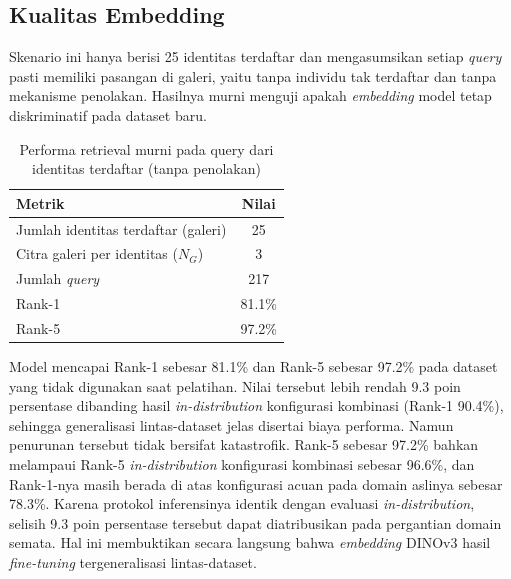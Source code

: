 \subsection{Kualitas Embedding}
\label{subsec:openset_retrieval_only}

Skenario ini hanya berisi 25 identitas terdaftar dan mengasumsikan setiap \textit{query}
pasti memiliki pasangan di galeri, yaitu tanpa individu tak terdaftar dan tanpa mekanisme
penolakan. Hasilnya murni menguji apakah \textit{embedding} model tetap diskriminatif pada
dataset baru.

\begin{table}[htbp]
    \centering
    \caption{Performa retrieval murni pada query dari identitas terdaftar (tanpa penolakan)}
    \label{tab:crossdataset_retrieval_only}
    \renewcommand{\arraystretch}{1.25}
    \begin{tabular}{lc}
        \hline
        \textbf{Metrik}                     & \textbf{Nilai} \\
        \hline
        Jumlah identitas terdaftar (galeri) & 25             \\
        Citra galeri per identitas ($N_G$)  & 3              \\
        Jumlah \textit{query}               & 217            \\
        Rank-1                              & 81.1\%         \\
        Rank-5                              & 97.2\%         \\
        \hline
    \end{tabular}
\end{table}

Model mencapai Rank-1 sebesar 81.1\% dan Rank-5 sebesar 97.2\% pada dataset yang tidak
digunakan saat pelatihan. Nilai tersebut lebih rendah 9.3 poin persentase dibanding hasil
\textit{in-distribution} konfigurasi kombinasi (Rank-1 90.4\%), sehingga generalisasi
lintas-dataset jelas disertai biaya performa. Namun penurunan tersebut tidak bersifat
katastrofik. Rank-5 sebesar 97.2\% bahkan melampaui Rank-5 \textit{in-distribution}
konfigurasi kombinasi sebesar 96.6\%, dan Rank-1-nya masih berada di atas konfigurasi
acuan pada domain aslinya sebesar 78.3\%. Karena protokol inferensinya identik dengan
evaluasi \textit{in-distribution}, selisih 9.3 poin persentase tersebut dapat
diatribusikan pada pergantian domain semata. Hal ini membuktikan secara langsung bahwa
\textit{embedding} DINOv3 hasil \textit{fine-tuning} tergeneralisasi lintas-dataset.

